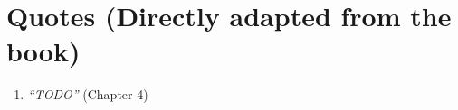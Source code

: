 \section*{Quotes (Directly adapted from the book)}
\begin{enumerate}
    \item \emph{``TODO''} (Chapter 4)
\end{enumerate}